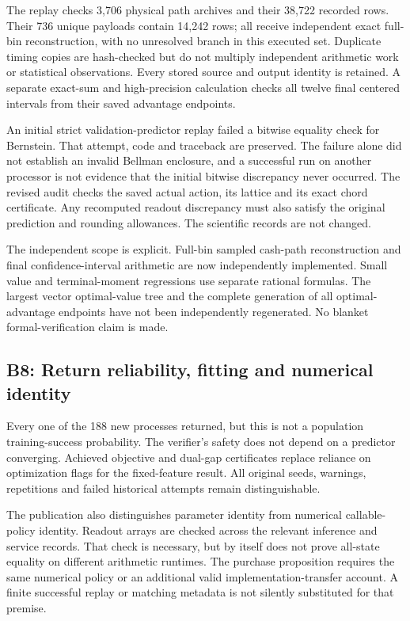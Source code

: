 \documentclass[ecta,nameyear,draft]{econsocart}
\begin{document}
The replay checks 3,706 physical path archives and their 38,722 recorded
rows. Their 736 unique payloads contain 14,242 rows; all receive
independent exact full-bin reconstruction, with no unresolved branch in
this executed set. Duplicate timing copies are hash-checked but do not
multiply independent arithmetic work or statistical observations. Every
stored source and output identity is retained. A separate exact-sum and
high-precision calculation checks all twelve final centered intervals
from their saved advantage endpoints.

An initial strict validation-predictor replay failed a bitwise equality
check for Bernstein. That attempt, code and traceback are preserved. The
failure alone did not establish an invalid Bellman enclosure, and a
successful run on another processor is not evidence that the initial
bitwise discrepancy never occurred. The revised audit checks the saved
actual action, its lattice and its exact chord certificate. Any
recomputed readout discrepancy must also satisfy the original prediction
and rounding allowances. The scientific records are not changed.

The independent scope is explicit. Full-bin sampled cash-path
reconstruction and final confidence-interval arithmetic are now
independently implemented. Small value and terminal-moment regressions
use separate rational formulas. The largest vector optimal-value tree
and the complete generation of all optimal-advantage endpoints have not
been independently regenerated. No blanket formal-verification claim is
made.

\hypertarget{b8-return-reliability-fitting-and-numerical-identity}{%
\subsection{B8: Return reliability, fitting and numerical
identity}\label{b8-return-reliability-fitting-and-numerical-identity}}

Every one of the 188 new processes returned, but this is not a
population training-success probability. The verifier's safety does not
depend on a predictor converging. Achieved objective and dual-gap
certificates replace reliance on optimization flags for the
fixed-feature result. All original seeds, warnings, repetitions and
failed historical attempts remain distinguishable.

The publication also distinguishes parameter identity from numerical
callable-policy identity. Readout arrays are checked across the relevant
inference and service records. That check is necessary, but by itself
does not prove all-state equality on different arithmetic runtimes. The
purchase proposition requires the same numerical policy or an additional
valid implementation-transfer account. A finite successful replay or
matching metadata is not silently substituted for that premise.
\end{document}

